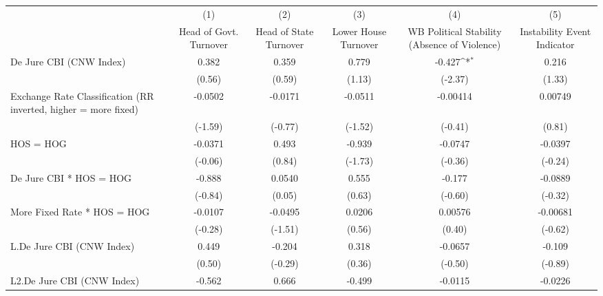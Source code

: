 {
\def\sym#1{\ifmmode^{#1}\else\(^{#1}\)\fi}
\begin{tabular}{l*{5}{c}}
\hline\hline
                &\multicolumn{1}{c}{(1)}&\multicolumn{1}{c}{(2)}&\multicolumn{1}{c}{(3)}&\multicolumn{1}{c}{(4)}&\multicolumn{1}{c}{(5)}\\
                &\multicolumn{1}{c}{Head of Govt. Turnover}&\multicolumn{1}{c}{Head of State Turnover}&\multicolumn{1}{c}{Lower House Turnover}&\multicolumn{1}{c}{WB Political Stability (Absence of Violence)}&\multicolumn{1}{c}{Instability Event Indicator}\\
\hline
De Jure CBI (CNW Index)&    0.382         &    0.359         &    0.779         &   -0.427\sym{*}  &    0.216         \\
                &   (0.56)         &   (0.59)         &   (1.13)         &  (-2.37)         &   (1.33)         \\
[1em]
Exchange Rate Classification (RR inverted, higher = more fixed)&  -0.0502         &  -0.0171         &  -0.0511         & -0.00414         &  0.00749         \\
                &  (-1.59)         &  (-0.77)         &  (-1.52)         &  (-0.41)         &   (0.81)         \\
[1em]
HOS = HOG       &  -0.0371         &    0.493         &   -0.939         &  -0.0747         &  -0.0397         \\
                &  (-0.06)         &   (0.84)         &  (-1.73)         &  (-0.36)         &  (-0.24)         \\
[1em]
De Jure CBI * HOS = HOG&   -0.888         &   0.0540         &    0.555         &   -0.177         &  -0.0889         \\
                &  (-0.84)         &   (0.05)         &   (0.63)         &  (-0.60)         &  (-0.32)         \\
[1em]
More Fixed Rate * HOS = HOG&  -0.0107         &  -0.0495         &   0.0206         &  0.00576         & -0.00681         \\
                &  (-0.28)         &  (-1.51)         &   (0.56)         &   (0.40)         &  (-0.62)         \\
[1em]
L.De Jure CBI (CNW Index)&    0.449         &   -0.204         &    0.318         &  -0.0657         &   -0.109         \\
                &   (0.50)         &  (-0.29)         &   (0.36)         &  (-0.50)         &  (-0.89)         \\
[1em]
L2.De Jure CBI (CNW Index)&   -0.562         &    0.666         &   -0.499         &  -0.0115         &  -0.0226         \\

\end{tabular}}
